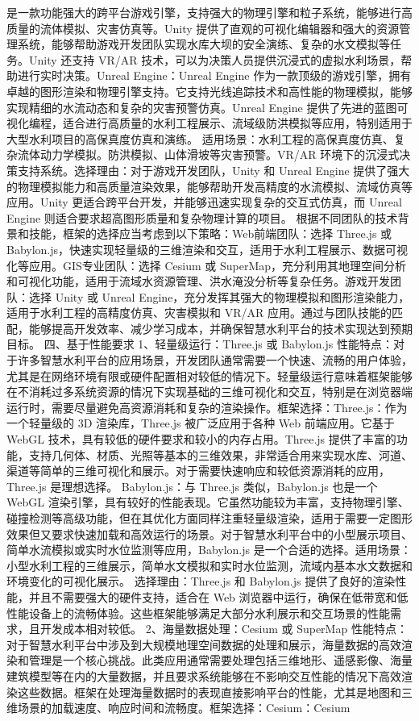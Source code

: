 {{{是一款功能强大的跨平台游戏引擎，支持强大的物理引擎和粒子系统，能够进行高质量的流体模拟、灾害仿真等。Unity 提供了直观的可视化编辑器和强大的资源管理系统，能够帮助游戏开发团队实现水库大坝的安全演练、复杂的水文模拟等任务。Unity 还支持 VR/AR 技术，可以为决策人员提供沉浸式的虚拟水利场景，帮助进行实时决策。Unreal Engine：Unreal Engine 作为一款顶级的游戏引擎，拥有卓越的图形渲染和物理引擎支持。它支持光线追踪技术和高性能的物理模拟，能够实现精细的水流动态和复杂的灾害预警仿真。Unreal Engine 提供了先进的蓝图可视化编程，适合进行高质量的水利工程展示、流域级防洪模拟等应用，特别适用于大型水利项目的高保真度仿真和演练。 适用场景：水利工程的高保真度仿真、复杂流体动力学模拟。防洪模拟、山体滑坡等灾害预警。VR/AR 环境下的沉浸式决策支持系统。选择理由：对于游戏开发团队，Unity 和 Unreal Engine 提供了强大的物理模拟能力和高质量渲染效果，能够帮助开发高精度的水流模拟、流域仿真等应用。Unity 更适合跨平台开发，并能够迅速实现复杂的交互式仿真，而 Unreal Engine 则适合要求超高图形质量和复杂物理计算的项目。 根据不同团队的技术背景和技能，框架的选择应当考虑到以下策略：Web前端团队：选择 Three.js 或 Babylon.js，快速实现轻量级的三维渲染和交互，适用于水利工程展示、数据可视化等应用。GIS专业团队：选择 Cesium 或 SuperMap，充分利用其地理空间分析和可视化功能，适用于流域水资源管理、洪水淹没分析等复杂任务。游戏开发团队：选择 Unity 或 Unreal Engine，充分发挥其强大的物理模拟和图形渲染能力，适用于水利工程的高精度仿真、灾害模拟和 VR/AR 应用。通过与团队技能的匹配，能够提高开发效率、减少学习成本，并确保智慧水利平台的技术实现达到预期目标。 四、基于性能要求 1、轻量级运行：Three.js 或 Babylon.js 性能特点：对于许多智慧水利平台的应用场景，开发团队通常需要一个快速、流畅的用户体验，尤其是在网络环境有限或硬件配置相对较低的情况下。轻量级运行意味着框架能够在不消耗过多系统资源的情况下实现基础的三维可视化和交互，特别是在浏览器端运行时，需要尽量避免高资源消耗和复杂的渲染操作。框架选择：Three.js：作为一个轻量级的 3D 渲染库，Three.js 被广泛应用于各种 Web 前端应用。它基于 WebGL 技术，具有较低的硬件要求和较小的内存占用。Three.js 提供了丰富的功能，支持几何体、材质、光照等基本的三维效果，非常适合用来实现水库、河道、渠道等简单的三维可视化和展示。对于需要快速响应和较低资源消耗的应用，Three.js 是理想选择。 Babylon.js：与 Three.js 类似，Babylon.js 也是一个 WebGL 渲染引擎，具有较好的性能表现。它虽然功能较为丰富，支持物理引擎、碰撞检测等高级功能，但在其优化方面同样注重轻量级渲染，适用于需要一定图形效果但又要求快速加载和高效运行的场景。对于智慧水利平台中的小型展示项目、简单水流模拟或实时水位监测等应用，Babylon.js 是一个合适的选择。适用场景：小型水利工程的三维展示，简单水文模拟和实时水位监测，流域内基本水文数据和环境变化的可视化展示。 选择理由：Three.js 和 Babylon.js 提供了良好的渲染性能，并且不需要强大的硬件支持，适合在 Web 浏览器中运行，确保在低带宽和低性能设备上的流畅体验。这些框架能够满足大部分水利展示和交互场景的性能需求，且开发成本相对较低。 2、海量数据处理：Cesium 或 SuperMap 性能特点：对于智慧水利平台中涉及到大规模地理空间数据的处理和展示，海量数据的高效渲染和管理是一个核心挑战。此类应用通常需要处理包括三维地形、遥感影像、海量建筑模型等在内的大量数据，并且要求系统能够在不影响交互性能的情况下高效渲染这些数据。框架在处理海量数据时的表现直接影响平台的性能，尤其是地图和三维场景的加载速度、响应时间和流畅度。框架选择：Cesium：Cesium }}}
